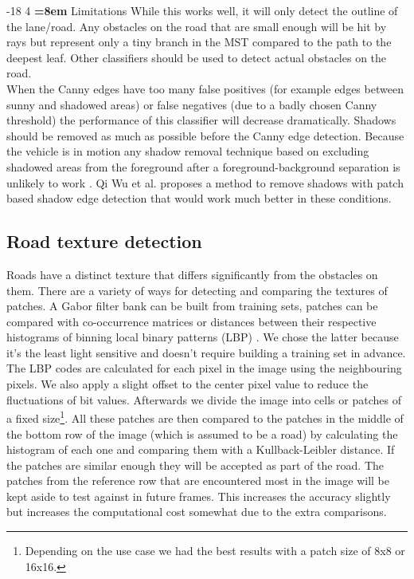 \documentclass[oneside,english]{llncs}
\makeatletter
\renewcommand\subsubsection{\@startsection{subsubsection}{3}{\z@}%
                       {-18\p@ \@plus -4\p@ \@minus -4\p@}%
                       {4\p@ \@plus 2\p@ \@minus 2\p@}%
                       {\normalfont\normalsize\bfseries\boldmath
                        \rightskip=\z@ \@plus 8em\pretolerance=10000 }}
\makeatother
\begin{document}
\subsubsection{Limitations}
While this works well, it will only detect the outline of the lane/road. Any obstacles on the road that are small enough will be hit by rays but represent only a tiny branch in the MST compared to the path to the deepest leaf. Other classifiers should be used to detect actual obstacles on the road.\\
When the Canny edges have too many false positives (for example edges between sunny and shadowed areas) or false negatives (due to a badly chosen Canny threshold) the performance of this classifier will decrease dramatically. Shadows should be removed as much as possible before the Canny edge detection. Because the vehicle is in motion any shadow removal technique based on excluding shadowed areas from the foreground after a foreground-background separation is unlikely to work \cite{key-6}. Qi Wu et al. proposes a method to remove shadows with patch based shadow edge detection \cite{key-3} that would work much better in these conditions.

\subsection{Road texture detection}
Roads have a distinct texture that differs significantly from the obstacles on them. There are a variety of ways for detecting and comparing the textures of patches. A Gabor filter bank can be built from training sets, patches can be compared with co-occurrence matrices or distances between their respective histograms of binning local binary patterns (LBP) \cite{key-14}. We chose the latter because it's the least light sensitive and doesn't require building a training set in advance. The LBP codes are calculated for each pixel in the image using the neighbouring pixels. We also apply a slight offset to the center pixel value to reduce the fluctuations of bit values. Afterwards we divide the image into cells or patches of a fixed size\footnote{Depending on the use case we had the best results with a patch size of 8x8 or 16x16.}. All these patches are then compared to the patches in the middle of the bottom row of the image (which is assumed to be a road) by calculating the histogram of each one and comparing them with a Kullback-Leibler distance. If the patches are similar enough they will be accepted as part of the road. The patches from the reference row that are encountered most in the image will be kept aside to test against in future frames. This increases the accuracy slightly but increases the computational cost somewhat due to the extra comparisons.
\end{document}
